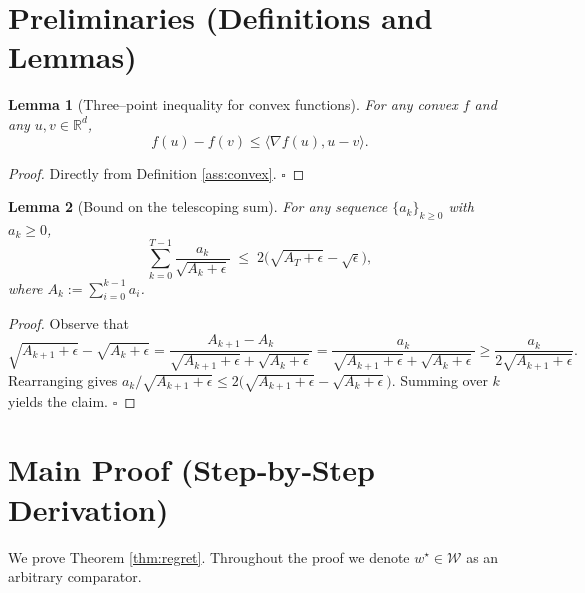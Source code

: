 \documentclass[11pt]{article}
\newtheorem{lemma}{Lemma}
\newcommand{\R}{\mathbb{R}}
\begin{document}
\newpage
\section*{Preliminaries (Definitions and Lemmas)}
\begin{lemma}[Three–point inequality for convex functions]\label{lem:convex}
For any convex $f$ and any $u,v\in\R^d$,
\[
f(u)-f(v)\le \langle \nabla f(u),u-v\rangle .
\]
\end{lemma}
\begin{proof}
Directly from Definition \ref{ass:convex}. \hfill $\square$
\end{proof}
\begin{lemma}[Bound on the telescoping sum]\label{lem:telescoping}
For any sequence $\{a_k\}_{k\ge0}$ with $a_k\ge0$,
\[
\sum_{k=0}^{T-1}\frac{a_k}{\sqrt{A_k+\epsilon}}
\;\le\;
2\bigl(\sqrt{A_T+\epsilon}-\sqrt{\epsilon}\bigr),
\]
where $A_k:=\sum_{i=0}^{k-1} a_i$.
\end{lemma}
\begin{proof}
Observe that
\[
\sqrt{A_{k+1}+\epsilon}-\sqrt{A_k+\epsilon}
=\frac{A_{k+1}-A_k}{\sqrt{A_{k+1}+\epsilon}+\sqrt{A_k+\epsilon}}
=\frac{a_k}{\sqrt{A_{k+1}+\epsilon}+\sqrt{A_k+\epsilon}}
\ge \frac{a_k}{2\sqrt{A_{k+1}+\epsilon}} .
\]
Rearranging gives $a_k/\sqrt{A_{k+1}+\epsilon}\le 2\bigl(\sqrt{A_{k+1}+\epsilon}-\sqrt{A_k+\epsilon}\bigr)$. Summing over $k$ yields the claim. \hfill $\square$
\end{proof}

\section*{Main Proof (Step‑by‑Step Derivation)}
We prove Theorem \ref{thm:regret}. Throughout the proof we denote $w^{\star}\in\mathcal{W}$ as an arbitrary comparator.
\end{document}
